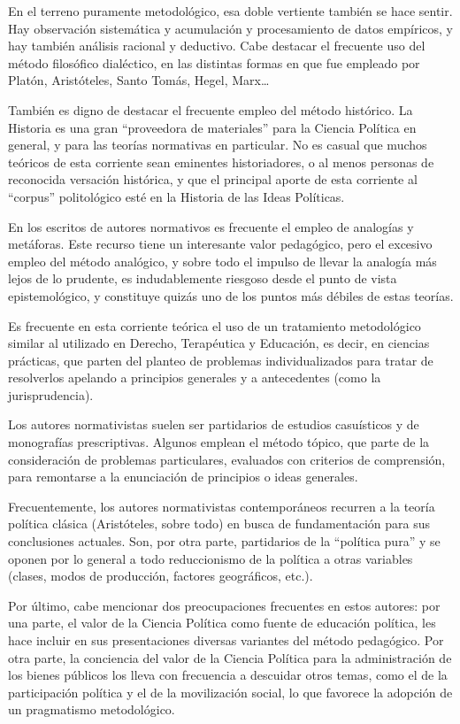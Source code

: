 \documentclass[
]{book}
\begin{document}
En el terreno puramente metodológico, esa doble vertiente también se hace sentir. Hay observación sistemática y acumulación y procesamiento de datos empíricos, y hay también análisis racional y deductivo. Cabe destacar el frecuente uso del método filosófico dialéctico, en las distintas formas en que fue empleado por Platón, Aristóteles, Santo Tomás, Hegel, Marx\ldots{}

También es digno de destacar el frecuente empleo del método histórico. La Historia es una gran ``proveedora de materiales'' para la Ciencia Política en general, y para las teorías normativas en particular. No es casual que muchos teóricos de esta corriente sean eminentes historiadores, o al menos personas de reconocida versación histórica, y que el principal aporte de esta corriente al ``corpus'' politológico esté en la Historia de las Ideas Políticas.

En los escritos de autores normativos es frecuente el empleo de analogías y metáforas. Este recurso tiene un interesante valor pedagógico, pero el excesivo empleo del método analógico, y sobre todo el impulso de llevar la analogía más lejos de lo prudente, es indudablemente riesgoso desde el punto de vista epistemológico, y constituye quizás uno de los puntos más débiles de estas teorías.

Es frecuente en esta corriente teórica el uso de un tratamiento metodológico similar al utilizado en Derecho, Terapéutica y Educación, es decir, en ciencias prácticas, que parten del planteo de problemas individualizados para tratar de resolverlos apelando a principios generales y a antecedentes (como la jurisprudencia).

Los autores normativistas suelen ser partidarios de estudios casuísticos y de monografías prescriptivas. Algunos emplean el método tópico, que parte de la consideración de problemas particulares, evaluados con criterios de comprensión, para remontarse a la enunciación de principios o ideas generales.

Frecuentemente, los autores normativistas contemporáneos recurren a la teoría política clásica (Aristóteles, sobre todo) en busca de fundamentación para sus conclusiones actuales. Son, por otra parte, partidarios de la ``política pura'' y se oponen por lo general a todo reduccionismo de la política a otras variables (clases, modos de producción, factores geográficos, etc.).

Por último, cabe mencionar dos preocupaciones frecuentes en estos autores: por una parte, el valor de la Ciencia Política como fuente de educación política, les hace incluir en sus presentaciones diversas variantes del método pedagógico. Por otra parte, la conciencia del valor de la Ciencia Política para la administración de los bienes públicos los lleva con frecuencia a descuidar otros temas, como el de la participación política y el de la movilización social, lo que favorece la adopción de un pragmatismo metodológico.
\end{document}
